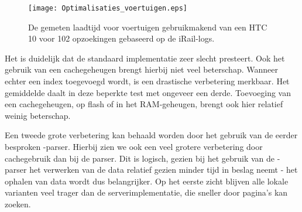 \begin{figure}[h]
	\centering
	\texttt{[image: Optimalisaties\_voertuigen.eps]}
	\caption[Gemeten laadtijd voertuigen bij verschillende implementatiedetails]{De gemeten laadtijd voor voertuigen gebruikmakend van een HTC 10 voor 102 opzoekingen gebaseerd op de iRail-logs. }
	\label{fig:vehiclelabtest}
\end{figure}

%		
%		

Het is duidelijk dat de standaard implementatie zeer slecht presteert. Ook het gebruik van een cachegeheugen brengt hierbij niet veel beterschap. Wanneer echter een index toegevoegd wordt, is een drastische verbetering merkbaar. Het gemiddelde daalt in deze beperkte test met ongeveer een derde. Toevoeging van een cachegeheugen, op flash of in het RAM-geheugen, brengt ook hier relatief weinig beterschap. 

Een tweede grote verbetering kan behaald worden door het gebruik van de eerder besproken -parser. Hierbij zien we ook een veel grotere verbetering door cachegebruik dan bij de  parser. Dit is logisch, gezien bij het gebruik van de -parser het verwerken van de data relatief gezien minder tijd in beslag neemt - het ophalen van data wordt dus belangrijker. Op het eerste zicht blijven alle lokale varianten veel trager dan de serverimplementatie, die sneller door pagina's kan zoeken.

